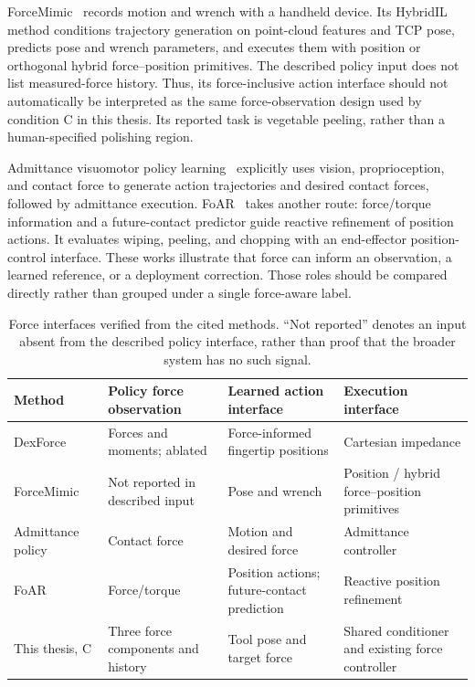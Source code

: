 ForceMimic~\cite{liu2025forcemimic} records motion and wrench with a handheld device. Its HybridIL method conditions trajectory generation on point-cloud features and TCP pose, predicts pose and wrench parameters, and executes them with position or orthogonal hybrid force--position primitives. The described policy input does not list measured-force history. Thus, its force-inclusive action interface should not automatically be interpreted as the same force-observation design used by condition C in this thesis. Its reported task is vegetable peeling, rather than a human-specified polishing region.

Admittance visuomotor policy learning~\cite{zhou2024admitdiff} explicitly uses vision, proprioception, and contact force to generate action trajectories and desired contact forces, followed by admittance execution. FoAR~\cite{he2025foar} takes another route: force/torque information and a future-contact predictor guide reactive refinement of position actions. It evaluates wiping, peeling, and chopping with an end-effector position-control interface. These works illustrate that force can inform an observation, a learned reference, or a deployment correction. Those roles should be compared directly rather than grouped under a single force-aware label.

\begin{table}[tbp]
\centering\footnotesize
\caption[Force interfaces in related work]{Force interfaces verified from the cited methods. ``Not reported'' denotes an input absent from the described policy interface, rather than proof that the broader system has no such signal.}
\label{tab:related_positioning}
\begin{tabularx}{\textwidth}{P{0.18\textwidth}XXX}
\toprule Method & Policy force observation & Learned action interface & Execution interface \\ \midrule
DexForce~\cite{chen2025dexforce} & Forces and moments; ablated & Force-informed fingertip positions & Cartesian impedance \\
ForceMimic~\cite{liu2025forcemimic} & Not reported in described input & Pose and wrench & Position / hybrid force--position primitives \\
Admittance policy~\cite{zhou2024admitdiff} & Contact force & Motion and desired force & Admittance controller \\
FoAR~\cite{he2025foar} & Force/torque & Position actions; future-contact prediction & Reactive position refinement \\
This thesis, C & Three force components and history & Tool pose and target force & Shared conditioner and existing force controller \\
\bottomrule
\end{tabularx}
\end{table}

